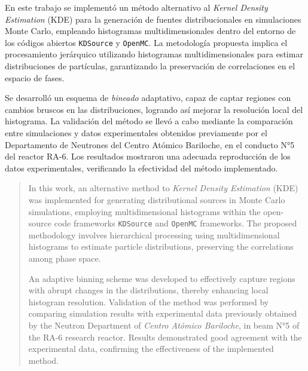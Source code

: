 \begin{resumen}%
En este trabajo se implementó un método alternativo al \textit{Kernel Density Estimation} (KDE) para la generación de fuentes distribucionales en simulaciones Monte Carlo, empleando histogramas multidimensionales dentro del entorno de los códigos abiertos \texttt{KDSource} y \texttt{OpenMC}. La metodología propuesta implica el procesamiento jerárquico utilizando histogramas multidimensionales para estimar distribuciones de partículas, garantizando la preservación de correlaciones en el espacio de fases.

Se desarrolló un esquema de \textit{bineado} adaptativo, capaz de captar regiones con cambios bruscos en las distribuciones, logrando así mejorar la resolución local del histograma. La validación del método se llevó a cabo mediante la comparación entre simulaciones y datos experimentales obtenidos previamente por el Departamento de Neutrones del Centro Atómico Bariloche, en el conducto N°5 del reactor RA-6. Los resultados mostraron una adecuada reproducción de los datos experimentales, verificando la efectividad del método implementado.

\end{resumen}

\begin{abstract}%
In this work, an alternative method to \textit{Kernel Density Estimation} (KDE) was implemented for generating distributional sources in Monte Carlo simulations, employing multidimensional histograms within the open-source code frameworks \texttt{KDSource} and \texttt{OpenMC} frameworks. The proposed methodology involves hierarchical processing using multidimensional histograms to estimate particle distributions, preserving the correlations among phase space.

An adaptive binning scheme was developed to effectively capture regions with abrupt changes in the distributions, thereby enhancing local histogram resolution. Validation of the method was performed by comparing simulation results with experimental data previously obtained by the Neutron Department of \textit{Centro Atómico Bariloche}, in beam N°5 of the RA-6 research reactor. Results demonstrated good agreement with the experimental data, confirming the effectiveness of the implemented method.

\end{abstract}




